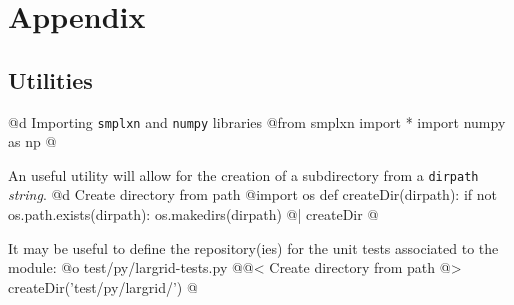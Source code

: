 \documentclass[11pt,oneside]{article}	%
\begin{document}
\section{Appendix}
\label{sec:utilities}

\subsection{Utilities}

@d Importing \texttt{smplxn} and \texttt{numpy} libraries
@{from smplxn import *
import numpy as np
@}

An useful utility will allow for the creation of a subdirectory from a \texttt{dirpath} \emph{string}.
@d Create directory from path 
@{import os
def createDir(dirpath):
    if not os.path.exists(dirpath):
        os.makedirs(dirpath)
@| createDir @}

It may be useful to define the repository(ies) for the unit tests associated to the module:
@o test/py/largrid-tests.py
@{@< Create directory from path @>
createDir('test/py/largrid/')
@}





\end{document}
